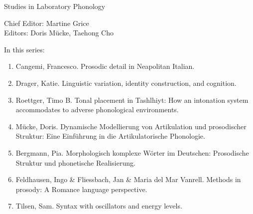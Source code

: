 
{\raggedleft{}}

\bigskip

{\large Studies in Laboratory Phonology}

\bigskip

Chief Editor:  Martine Grice%
\\
Editors:    Doris Mücke, %
    Taehong Cho %

\bigskip

In this series:

\begin{enumerate}
\item Cangemi, Francesco. Prosodic detail in Neapolitan Italian.
\item Drager, Katie. Linguistic variation, identity construction, and cognition.
\item Roettger, Timo B. Tonal placement in Tashlhiyt: How an intonation system accommodates to adverse phonological environments.
\item Mücke, Doris. Dynamische Modellierung von Artikulation und prosodischer Struktur: Eine Einführung in die Artikulatorische Phonologie.
\item Bergmann, Pia. Morphologisch komplexe Wörter im Deutschen: Prosodische Struktur und phonetische Realisierung. 
\item Feldhausen, Ingo \& Fliessbach, Jan \& Maria del Mar Vanrell. Methods in prosody: A Romance language perspective.
\item Tilsen, Sam. Syntax with oscillators and energy levels.
\end{enumerate}
